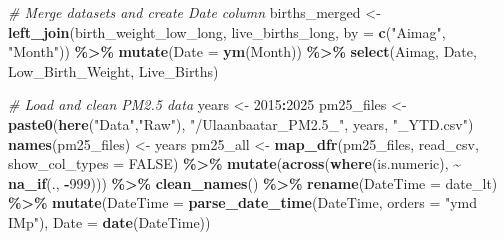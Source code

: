 \documentclass[
]{article}
\newenvironment{Shaded}{\begin{snugshade}}{\end{snugshade}}
\newcommand{\AttributeTok}[1]{\textcolor[rgb]{0.13,0.29,0.53}{#1}}
\newcommand{\CommentTok}[1]{\textcolor[rgb]{0.56,0.35,0.01}{\textit{#1}}}
\newcommand{\ConstantTok}[1]{\textcolor[rgb]{0.56,0.35,0.01}{#1}}
\newcommand{\DecValTok}[1]{\textcolor[rgb]{0.00,0.00,0.81}{#1}}
\newcommand{\FunctionTok}[1]{\textcolor[rgb]{0.13,0.29,0.53}{\textbf{#1}}}
\newcommand{\NormalTok}[1]{#1}
\newcommand{\OtherTok}[1]{\textcolor[rgb]{0.56,0.35,0.01}{#1}}
\newcommand{\SpecialCharTok}[1]{\textcolor[rgb]{0.81,0.36,0.00}{\textbf{#1}}}
\newcommand{\StringTok}[1]{\textcolor[rgb]{0.31,0.60,0.02}{#1}}
\begin{document}
\begin{Shaded}
\begin{Highlighting}[]
\CommentTok{\# Merge datasets and create Date column}
\NormalTok{births\_merged }\OtherTok{\textless{}{-}} \FunctionTok{left\_join}\NormalTok{(birth\_weight\_low\_long, live\_births\_long, }\AttributeTok{by =} \FunctionTok{c}\NormalTok{(}\StringTok{"Aimag"}\NormalTok{, }\StringTok{"Month"}\NormalTok{)) }\SpecialCharTok{\%\textgreater{}\%}
  \FunctionTok{mutate}\NormalTok{(}\AttributeTok{Date =} \FunctionTok{ym}\NormalTok{(Month)) }\SpecialCharTok{\%\textgreater{}\%}
  \FunctionTok{select}\NormalTok{(Aimag, Date, Low\_Birth\_Weight, Live\_Births)}
\end{Highlighting}
\end{Shaded}

\begin{Shaded}
\begin{Highlighting}[]
\CommentTok{\# Load and clean PM2.5 data}
\NormalTok{years }\OtherTok{\textless{}{-}} \DecValTok{2015}\SpecialCharTok{:}\DecValTok{2025}
\NormalTok{pm25\_files }\OtherTok{\textless{}{-}} \FunctionTok{paste0}\NormalTok{(}\FunctionTok{here}\NormalTok{(}\StringTok{"Data"}\NormalTok{,}\StringTok{"Raw"}\NormalTok{), }\StringTok{"/Ulaanbaatar\_PM2.5\_"}\NormalTok{, years, }\StringTok{"\_YTD.csv"}\NormalTok{)}
\FunctionTok{names}\NormalTok{(pm25\_files) }\OtherTok{\textless{}{-}}\NormalTok{ years}
\NormalTok{pm25\_all }\OtherTok{\textless{}{-}} \FunctionTok{map\_dfr}\NormalTok{(pm25\_files, read\_csv, }\AttributeTok{show\_col\_types =} \ConstantTok{FALSE}\NormalTok{) }\SpecialCharTok{\%\textgreater{}\%}
  \FunctionTok{mutate}\NormalTok{(}\FunctionTok{across}\NormalTok{(}\FunctionTok{where}\NormalTok{(is.numeric), }\SpecialCharTok{\textasciitilde{}} \FunctionTok{na\_if}\NormalTok{(., }\SpecialCharTok{{-}}\DecValTok{999}\NormalTok{))) }\SpecialCharTok{\%\textgreater{}\%}
  \FunctionTok{clean\_names}\NormalTok{() }\SpecialCharTok{\%\textgreater{}\%}
  \FunctionTok{rename}\NormalTok{(}\AttributeTok{DateTime =}\NormalTok{ date\_lt) }\SpecialCharTok{\%\textgreater{}\%}
  \FunctionTok{mutate}\NormalTok{(}\AttributeTok{DateTime =} \FunctionTok{parse\_date\_time}\NormalTok{(DateTime, }\AttributeTok{orders =} \StringTok{"ymd IMp"}\NormalTok{), }\AttributeTok{Date =} \FunctionTok{date}\NormalTok{(DateTime))}
\end{Highlighting}
\end{Shaded}
\end{document}
